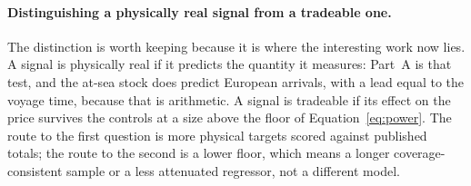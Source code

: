 \paragraph{Distinguishing a physically real signal from a tradeable one.} The
distinction is worth keeping because it is where the interesting work now lies. A
signal is physically real if it predicts the quantity it measures: Part~A is that
test, and the at-sea stock does predict European arrivals, with a lead equal to the
voyage time, because that is arithmetic. A signal is tradeable if its effect on the
price survives the controls at a size above the floor of
Equation~\eqref{eq:power}. The route to the first question is more physical
targets scored against published totals; the route to the second is a lower floor,
which means a longer coverage-consistent sample or a less attenuated regressor, not
a different model.
